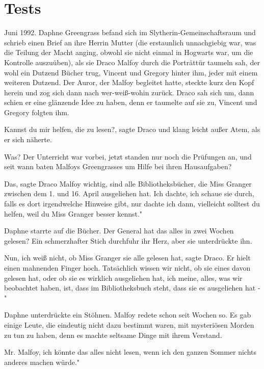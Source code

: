\chapter{Tests}

Juni 1992. Daphne Greengrass befand sich im Slytherin-Gemeinschaftsraum und
schrieb einen Brief an ihre Herrin Mutter (die erstaunlich unnachgiebig war, was
die Teilung der Macht anging, obwohl sie nicht einmal in Hogwarts war, um die
Kontrolle auszuüben), als sie Draco Malfoy durch die Porträttür taumeln sah, der
wohl ein Dutzend Bücher trug, Vincent und Gregory hinter ihm, jeder mit einem
weiteren Dutzend. Der Auror, der Malfoy begleitet hatte, steckte kurz den Kopf
herein und zog sich dann nach wer-weiß-wohin zurück. Draco sah sich um, dann
schien er eine glänzende Idee zu haben, denn er taumelte auf sie zu, Vincent und
Gregory folgten ihm.

\glqq{}Kannst du mir helfen, die zu lesen?\grqq{}, sagte Draco und klang leicht
außer Atem, als er sich näherte.

\glqq{}Was?\grqq{} Der Unterricht war vorbei, jetzt standen nur noch die
Prüfungen an, und seit wann baten Malfoys Greengrasses um Hilfe bei ihren
Hausaufgaben?

\glqq{}Das\grqq{}, sagte Draco Malfoy wichtig, \glqq{}sind alle Bibliotheksbücher,
die Miss Granger zwischen dem 1. und 16. April ausgeliehen hat. Ich dachte, ich
schaue sie durch, falls es dort irgendwelche Hinweise gibt, nur dachte ich dann,
vielleicht solltest du helfen, weil du Miss Granger besser kennst."

Daphne starrte auf die Bücher. \glqq{}Der General hat das alles in zwei Wochen
gelesen?\grqq{} Ein schmerzhafter Stich durchfuhr ihr Herz, aber sie
unterdrückte ihn.

\glqq{}Nun, ich weiß nicht, ob Miss Granger sie alle gelesen hat\grqq{}, sagte
Draco. Er hielt einen mahnenden Finger hoch. \glqq{}Tatsächlich wissen wir nicht,
ob sie eines davon gelesen hat, oder ob sie es wirklich ausgeliehen hat, ich
meine, alles, was wir beobachtet haben, ist, dass im Bibliotheksbuch steht, dass
sie es ausgeliehen hat -"

Daphne unterdrückte ein Stöhnen. Malfoy redete schon seit Wochen so. Es gab
einige Leute, die eindeutig nicht dazu bestimmt waren, mit mysteriösen Morden zu
tun zu haben, denn es machte seltsame Dinge mit ihrem Verstand.

\glqq{}Mr. Malfoy, ich könnte das alles nicht lesen, wenn ich den ganzen Sommer
nichts anderes machen würde."

